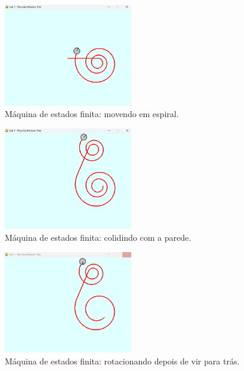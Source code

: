 \documentclass[brazil, 12pt]{article}
\begin{document}
\begin{figure}[H]
	\centering
	\includegraphics[width=0.5\textwidth]{BT_spiral} %
	\caption{Máquina de estados finita: movendo em espiral.} %
	\label{fig:BT_spiral}  %
\end{figure}

\begin{figure}[H]
	\centering
	\includegraphics[width=0.5\textwidth]{BT_collide} %
	\caption{Máquina de estados finita: colidindo com a parede.} %
	\label{fig:BT_collide}  %
\end{figure}

\begin{figure}[H]
	\centering
	\includegraphics[width=0.5\textwidth]{BT_back_rotate} %
	\caption{Máquina de estados finita: rotacionando depois de vir para trás.} %
	\label{fig:BT_back_rotate}  %
\end{figure}
\end{document}
